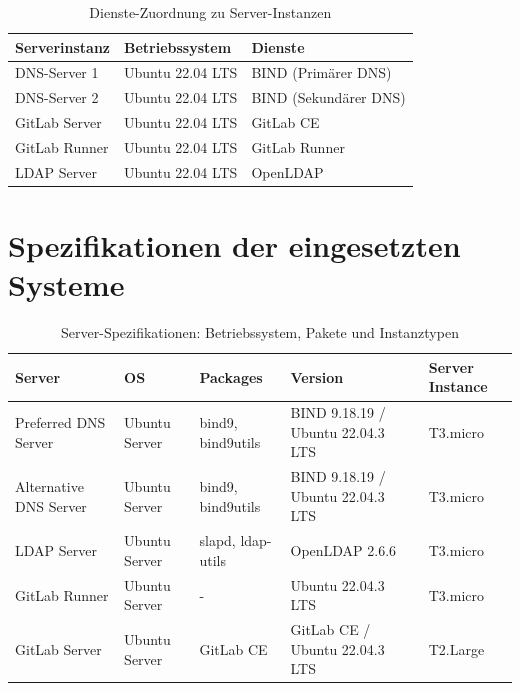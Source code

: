 \documentclass[a4paper,12pt]{article}
\begin{document}
\begin{table}[h!]
    \centering
    \begin{tabular}{|l|l|l|}
    \hline
    \textbf{Serverinstanz} & \textbf{Betriebssystem}  & \textbf{Dienste}         \\ \hline
    DNS-Server 1           & Ubuntu 22.04 LTS        & BIND (Primärer DNS)      \\ \hline
    DNS-Server 2           & Ubuntu 22.04 LTS        & BIND (Sekundärer DNS)    \\ \hline
    GitLab Server          & Ubuntu 22.04 LTS        & GitLab CE                \\ \hline
    GitLab Runner          & Ubuntu 22.04 LTS        & GitLab Runner            \\ \hline
    LDAP Server            & Ubuntu 22.04 LTS        & OpenLDAP                 \\ \hline
    \end{tabular}
    \caption{Dienste-Zuordnung zu Server-Instanzen}
\end{table}

\section{Spezifikationen der eingesetzten Systeme}

\begin{table}[h!]
    \centering
    \begin{tabular}{|l|l|l|l|l|}
    \hline
    \textbf{Server}               & \textbf{OS}                 & \textbf{Packages}          & \textbf{Version}                     & \textbf{Server Instance} \\ \hline
    Preferred DNS Server          & Ubuntu Server              & bind9, bind9utils          & BIND 9.18.19 / Ubuntu 22.04.3 LTS    & T3.micro                \\ \hline
    Alternative DNS Server        & Ubuntu Server              & bind9, bind9utils          & BIND 9.18.19 / Ubuntu 22.04.3 LTS    & T3.micro                \\ \hline
    LDAP Server                   & Ubuntu Server              & slapd, ldap-utils          & OpenLDAP 2.6.6                       & T3.micro                \\ \hline
    GitLab Runner                 & Ubuntu Server              & -                          & Ubuntu 22.04.3 LTS                   & T3.micro                \\ \hline
    GitLab Server                 & Ubuntu Server              & GitLab CE                  & GitLab CE / Ubuntu 22.04.3 LTS       & T2.Large                \\ \hline
    \end{tabular}
    \caption{Server-Spezifikationen: Betriebssystem, Pakete und Instanztypen}
    \label{tab:server-specs}
\end{table}
    
\end{document}
